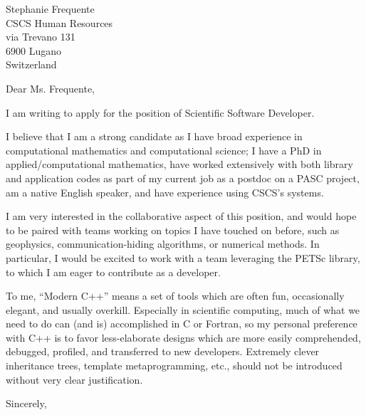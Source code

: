 \documentclass{letter}
\begin{document}
\begin{letter}{Stephanie Frequente\\CSCS Human Resources\\via Trevano 131\\6900 Lugano\\Switzerland}
\opening{Dear Ms. Frequente,}

I am writing to apply for the position of Scientific Software Developer.

I believe that I am a strong candidate as I have broad experience in computational mathematics and computational science; I have a PhD in applied/computational mathematics, have worked extensively with both library and application codes as part of my current job as a postdoc on a PASC project, am a native English speaker, and have experience using CSCS's systems.

I am very interested in the collaborative aspect of this position, and would hope to be paired with teams working on topics I have touched on before, such as geophysics, communication-hiding algorithms, or numerical methods. In particular, I would be excited to work with a team leveraging the PETSc library, to which I am eager to contribute as a developer.

To me, ``Modern C++'' means a set of tools which are often fun, occasionally elegant, and usually overkill. Especially in scientific computing, much of what we need to do can (and is) accomplished in C or Fortran, so my personal preference with C++ is to favor less-elaborate designs which are more easily comprehended, debugged, profiled, and transferred to new developers. Extremely clever inheritance trees, template metaprogramming, etc., should not be introduced without very clear justification. 

\closing{Sincerely,}
\end{letter}
\end{document}
